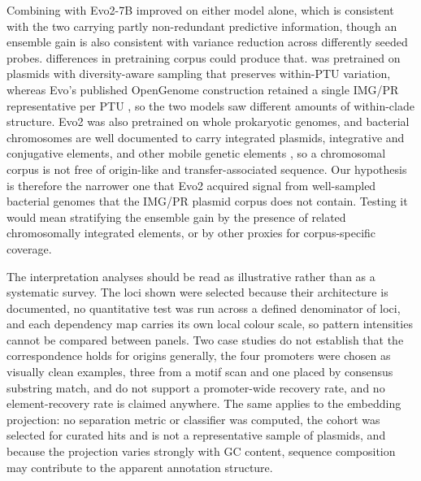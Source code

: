Combining \model with Evo2-7B improved on either model alone, which is
consistent with the two carrying partly non-redundant predictive information,
though an ensemble gain is also consistent with variance reduction across
differently seeded probes.
differences in pretraining corpus could produce that. \model was pretrained on
plasmids with diversity-aware sampling that preserves within-PTU variation,
whereas Evo's published OpenGenome construction retained a single IMG/PR
representative per PTU \cite{nguyen2024sequence}, so the two models saw different amounts of
within-clade structure. Evo2 was also pretrained on whole prokaryotic genomes,
and bacterial chromosomes are well documented to carry integrated plasmids,
integrative and conjugative elements, and other mobile genetic elements
\cite{guglielmini2011repertoire,cury2018host,johnson2015integrative,yan2025revealing},
so a chromosomal corpus is not free of origin-like and transfer-associated
sequence. Our hypothesis is therefore the narrower one that Evo2 acquired
signal from well-sampled bacterial genomes that the IMG/PR plasmid corpus does
not contain. Testing it would mean stratifying the ensemble gain by the
presence of related chromosomally integrated elements, or by other proxies for
corpus-specific coverage.

The interpretation analyses should be read as illustrative rather than as a
systematic survey. The loci shown were selected because their architecture is
documented, no quantitative test was run across a defined denominator of loci,
and each dependency map carries its own local colour scale, so pattern
intensities cannot be compared between panels. Two case studies do not
establish that the correspondence holds for origins generally, the four
promoters were chosen as visually clean examples, three from a motif scan and
one placed by consensus substring match, and do not
support a promoter-wide recovery rate, and no element-recovery rate is claimed
anywhere. The same applies to the embedding projection: no separation metric
or classifier was computed, the cohort was selected for curated hits and is
not a representative sample of plasmids, and because the projection varies
strongly with GC content, sequence composition may contribute to the apparent
annotation structure.

